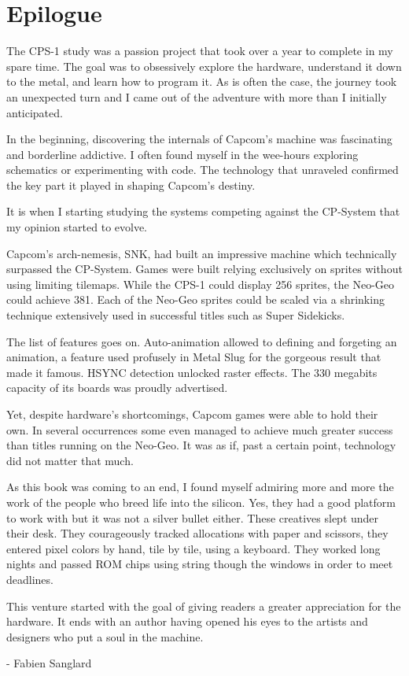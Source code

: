\chapter{Epilogue} 

The CPS-1 study was a passion project that took over a year to complete in my spare time. The goal was to obsessively explore the hardware, understand it down to the metal, and learn how to program it. As is often the case, the journey took an unexpected turn and I came out of the adventure with more than I initially anticipated.

In the beginning, discovering the internals of Capcom's machine was fascinating and borderline addictive. I often found myself in the wee-hours exploring schematics or experimenting with code. The technology that unraveled confirmed the key part it played in shaping Capcom's destiny. 

It is when I starting studying the systems competing against the CP-System that my opinion started to evolve. 

Capcom's arch-nemesis, SNK, had built an impressive machine which technically surpassed the CP-System. Games were built relying exclusively on sprites without using limiting tilemaps. While the CPS-1 could display 256 sprites, the Neo-Geo could achieve 381. Each of the Neo-Geo sprites could be scaled via a shrinking technique extensively used in successful titles such as Super Sidekicks. 

The list of features goes on. Auto-animation allowed to defining and forgeting an animation, a feature used profusely in Metal Slug for the gorgeous result that made it famous. HSYNC detection unlocked raster effects. The 330 megabits capacity of its boards was proudly advertised.

Yet, despite hardware's shortcomings, Capcom games were able to hold their own. In several occurrences some even managed to achieve much greater success than titles running on the Neo-Geo. It was as if, past a certain point, technology did not matter that much.

As this book was coming to an end, I found myself admiring more and more the work of the people who breed life into the silicon. Yes, they had a good platform to work with but it was not a silver bullet either. These creatives slept under their desk. They courageously tracked allocations with paper and scissors, they entered pixel colors by hand, tile by tile, using a keyboard. They worked long nights and passed ROM chips using string though the windows in order to meet deadlines.

This venture started with the goal of giving readers a greater appreciation for the hardware. It ends with an author having opened his eyes to the artists and designers who put a soul in the machine.

- Fabien Sanglard
